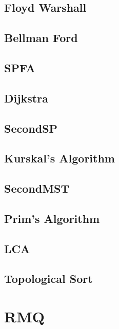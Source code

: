     \subsection{Floyd Warshall}
        
    \subsection{Bellman Ford}
        
    \subsection{SPFA}
        
    \subsection{Dijkstra}
         
    \subsection{SecondSP}
        
    \subsection{Kurskal's Algorithm}
        
    \subsection{SecondMST}
        
    \subsection{Prim's Algorithm}
        
    \subsection{LCA}
        
    \subsection{Topological Sort}
        


\section{RMQ}
